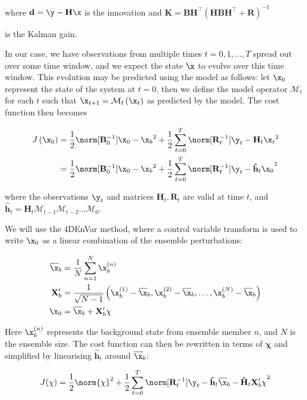 where $\mathbf{d} = \y - \mathbf{H}\x$ is the innovation and $\mathbf{K} = \mathbf{B}\mathbf{H}^\top\left(\mathbf{H}\mathbf{B}\mathbf{H}^\top + \mathbf{R}\right)^{-1}$

is the Kalman gain.

In our case, we have observations from multiple times $t = 0,1,\dots,T$ spread out over some time window, and we expect the state $\x$ to evolve over this time window. This evolution may be predicted using the model as follows: let $\x_0$ represent the state of the system at $t=0$, then we define the model operator $\mathcal{M}_t$ for each $t$ such that $\x_{t+1} = \mathcal{M}_t\left(\x_t\right)$ as predicted by the model. The cost function then becomes

\begin{align}
	J\left(\x_0\right) &= \frac 1 2 \norm[\mathbf{B}_0^{-1}]{\x_0 - \x_b}^2 + \frac 1 2 \sum_{t=0}^T \norm[\mathbf{R}_t^{-1}]{\y_t - \mathbf{H}_t\x_t}^2 \\
	&= \frac 1 2 \norm[\mathbf{B}_0^{-1}]{\x_0 - \x_b}^2 + \frac 1 2 \sum_{t=0}^T \norm[\mathbf{R}_t^{-1}]{\y_t - \mathbf{\hat{h}}_t\x_0}^2
\end{align}

where the observations $\y_t$ and matrices $\mathbf{H}_t,\mathbf{R}_t$ are valid at time $t$, and $\mathbf{\hat{h}}_t = \mathbf{H}_t\mathcal{M}_{t-1}\mathcal{M}_{t-2}\dots\mathcal{M}_0$.

We will use the 4DEnVar method, where a control variable transform is used to write $\x_0$ as a linear combination of the ensemble perturbations:

\begin{align*}
	\overline{\x}_b &= \frac 1 N \sum_{n=1}^N \x_b^{(n)} \\
	\mathbf{X}'_b &= \frac{1}{\sqrt{N- 1}} \left( \x_b^{(1)} - \overline{\x}_b, \x_b^{(2)} - \overline{\x}_b, \dots, \x_b^{(N)} - \overline{\x}_b \right) \\
	\x_0 &= \overline{\x}_b + \mathbf{X}'_b \mathbf{\chi}
\end{align*}

Here $\x_b^{(n)}$ represents the background state from ensemble member $n$, and $N$ is the ensemble size. The cost function can then be rewritten in terms of $\mathbf{\chi}$ and simplified by linearising $\mathbf{\hat{h}}_t$ around $\overline{\x}_b$:

\begin{equation}
J(\mathbf{\chi}) = \frac 1 2 \norm{\mathbf{\chi}}^2 + \frac 1 2 \sum_{t=0}^T \norm[\mathbf{R}_t^{-1}]{\y_t - \mathbf{\hat{h}}_t\overline{\x}_b - \mathbf{\hat{H}}_t \mathbf{X}'_b \mathbf{\chi}}^2
\end{equation}

